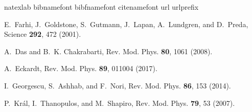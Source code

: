 \documentclass[aps,pra,twocolumn,groupedaddress,10pt]{revtex4}
\begin{document}
%
\begin{thebibliography}{42}
\expandafter\ifx\csname natexlab\endcsname\relax\def\natexlab#1{#1}\fi
\expandafter\ifx\csname bibnamefont\endcsname\relax
  \def\bibnamefont#1{#1}\fi
\expandafter\ifx\csname bibfnamefont\endcsname\relax
  \def\bibfnamefont#1{#1}\fi
\expandafter\ifx\csname citenamefont\endcsname\relax
  \def\citenamefont#1{#1}\fi
\expandafter\ifx\csname url\endcsname\relax
  \def\url#1{\texttt{#1}}\fi
\expandafter\ifx\csname urlprefix\endcsname\relax\def\urlprefix{URL }\fi
\providecommand{\bibinfo}[2]{#2}
\providecommand{\eprint}[2][]{\url{#2}}

\bibinfo{author}{\bibfnamefont{E.}~\bibnamefont{Farhi}},
  \bibinfo{author}{\bibfnamefont{J.}~\bibnamefont{Goldstone}},
  \bibinfo{author}{\bibfnamefont{S.}~\bibnamefont{Gutmann}},
  \bibinfo{author}{\bibfnamefont{J.}~\bibnamefont{Lapan}},
  \bibinfo{author}{\bibfnamefont{A.}~\bibnamefont{Lundgren}}, \bibnamefont{and}
  \bibinfo{author}{\bibfnamefont{D.}~\bibnamefont{Preda}},
  \bibinfo{journal}{Science} \textbf{\bibinfo{volume}{292}},
  \bibinfo{pages}{472} (\bibinfo{year}{2001}).

\bibinfo{author}{\bibfnamefont{A.}~\bibnamefont{Das}} \bibnamefont{and}
  \bibinfo{author}{\bibfnamefont{B.~K.} \bibnamefont{Chakrabarti}},
  \bibinfo{journal}{Rev. Mod. Phys.} \textbf{\bibinfo{volume}{80}},
  \bibinfo{pages}{1061} (\bibinfo{year}{2008}).

\bibinfo{author}{\bibfnamefont{A.}~\bibnamefont{Eckardt}},
  \bibinfo{journal}{Rev. Mod. Phys.} \textbf{\bibinfo{volume}{89}},
  \bibinfo{pages}{011004} (\bibinfo{year}{2017}).

\bibinfo{author}{\bibfnamefont{I.}~\bibnamefont{Georgescu}},
  \bibinfo{author}{\bibfnamefont{S.}~\bibnamefont{Ashhab}}, \bibnamefont{and}
  \bibinfo{author}{\bibfnamefont{F.}~\bibnamefont{Nori}},
  \bibinfo{journal}{Rev. Mod. Phys.} \textbf{\bibinfo{volume}{86}},
  \bibinfo{pages}{153} (\bibinfo{year}{2014}).

\bibinfo{author}{\bibfnamefont{P.}~\bibnamefont{Kr{\'a}l}},
  \bibinfo{author}{\bibfnamefont{I.}~\bibnamefont{Thanopulos}},
  \bibnamefont{and} \bibinfo{author}{\bibfnamefont{M.}~\bibnamefont{Shapiro}},
  \bibinfo{journal}{Rev. Mod. Phys.} \textbf{\bibinfo{volume}{79}},
  \bibinfo{pages}{53} (\bibinfo{year}{2007}).


\end{thebibliography}
\end{document}
